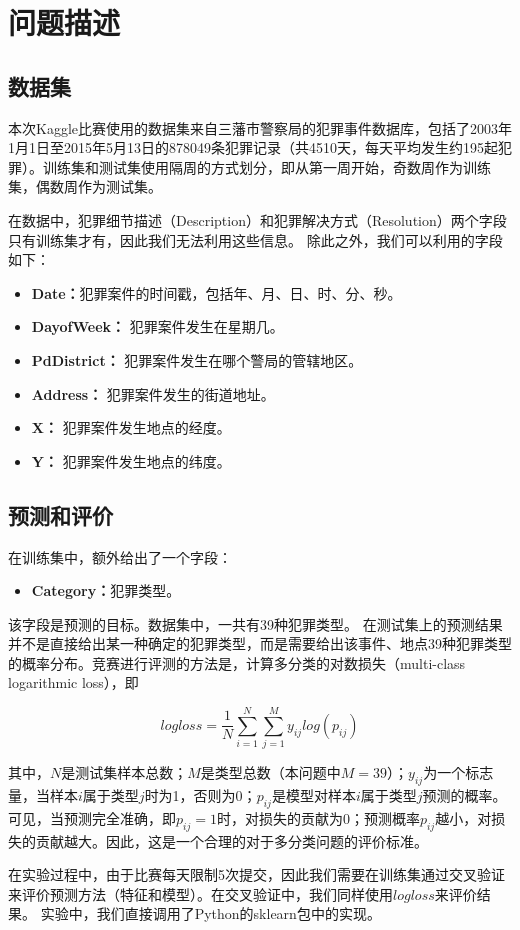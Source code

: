 \section{问题描述}
\label{sec:problem}

\subsection{数据集}

本次Kaggle比赛使用的数据集来自三藩市警察局的犯罪事件数据库，包括了2003年1月1日至2015年5月13日的878049条犯罪记录（共4510天，每天平均发生约195起犯罪）。训练集和测试集使用隔周的方式划分，即从第一周开始，奇数周作为训练集，偶数周作为测试集。

在数据中，犯罪细节描述（Description）和犯罪解决方式（Resolution）两个字段只有训练集才有，因此我们无法利用这些信息。
除此之外，我们可以利用的字段如下：

\begin{itemize}
    \item \textbf{Date：}犯罪案件的时间戳，包括年、月、日、时、分、秒。
    \item \textbf{DayofWeek：}
    犯罪案件发生在星期几。
    \item \textbf{PdDistrict：}
    犯罪案件发生在哪个警局的管辖地区。
    \item \textbf{Address：}
    犯罪案件发生的街道地址。
    \item \textbf{X：}
    犯罪案件发生地点的经度。
    \item \textbf{Y：}
    犯罪案件发生地点的纬度。
\end{itemize}

\subsection{预测和评价}

在训练集中，额外给出了一个字段：

\begin{itemize}
    \item \textbf{Category：}犯罪类型。
\end{itemize}

该字段是预测的目标。数据集中，一共有39种犯罪类型。
在测试集上的预测结果并不是直接给出某一种确定的犯罪类型，而是需要给出该事件、地点39种犯罪类型的概率分布。竞赛进行评测的方法是，计算多分类的对数损失（multi-class logarithmic loss），即

\begin{equation*}
    logloss=\frac{1}{N} \sum_{i=1}^N \sum_{j=1}^M y_{ij} log(p_{ij})
\end{equation*}

其中，$N$是测试集样本总数；$M$是类型总数（本问题中$M=39$）；$y_{ij}$为一个标志量，当样本$i$属于类型$j$时为1，否则为0；$p_{ij}$是模型对样本$i$属于类型$j$预测的概率。可见，当预测完全准确，即$p_{ij}=1$时，对损失的贡献为0；预测概率$p_{ij}$越小，对损失的贡献越大。因此，这是一个合理的对于多分类问题的评价标准。

在实验过程中，由于比赛每天限制5次提交，因此我们需要在训练集通过交叉验证来评价预测方法（特征和模型）。在交叉验证中，我们同样使用$logloss$来评价结果。
实验中，我们直接调用了Python的sklearn包中的实现。

